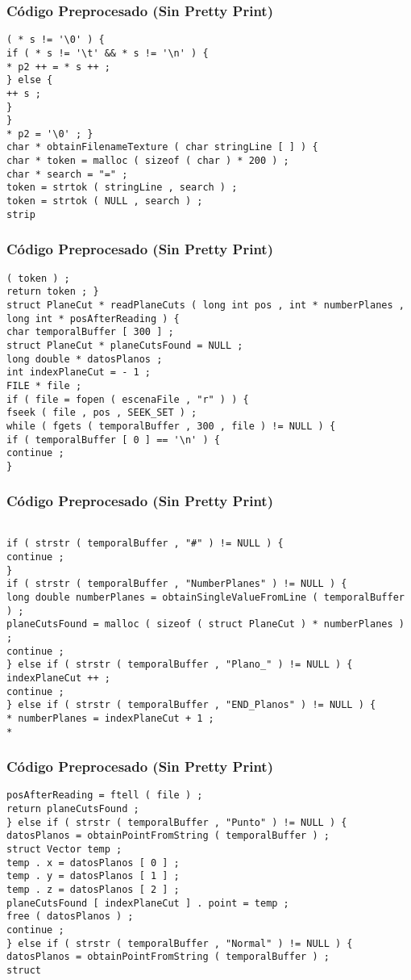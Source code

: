 \documentclass{beamer}
\begin{document}
\begin{frame}[fragile]
\frametitle{C\'odigo Preprocesado (Sin Pretty Print)}
\begin{lstlisting}[style=CStyle]
( * s != '\0' ) { 
if ( * s != '\t' && * s != '\n' ) { 
* p2 ++ = * s ++ ; 
} else { 
++ s ; 
} 
} 
* p2 = '\0' ; } 
char * obtainFilenameTexture ( char stringLine [ ] ) { 
char * token = malloc ( sizeof ( char ) * 200 ) ; 
char * search = "=" ; 
token = strtok ( stringLine , search ) ; 
token = strtok ( NULL , search ) ; 
strip \end{lstlisting}
\end{frame}
\begin{frame}[fragile]
\frametitle{C\'odigo Preprocesado (Sin Pretty Print)}
\begin{lstlisting}[style=CStyle]
( token ) ; 
return token ; } 
struct PlaneCut * readPlaneCuts ( long int pos , int * numberPlanes , long int * posAfterReading ) { 
char temporalBuffer [ 300 ] ; 
struct PlaneCut * planeCutsFound = NULL ; 
long double * datosPlanos ; 
int indexPlaneCut = - 1 ; 
FILE * file ; 
if ( file = fopen ( escenaFile , "r" ) ) { 
fseek ( file , pos , SEEK_SET ) ; 
while ( fgets ( temporalBuffer , 300 , file ) != NULL ) { 
if ( temporalBuffer [ 0 ] == '\n' ) { 
continue ; 
} \end{lstlisting}
\end{frame}
\begin{frame}[fragile]
\frametitle{C\'odigo Preprocesado (Sin Pretty Print)}
\begin{lstlisting}[style=CStyle]

if ( strstr ( temporalBuffer , "#" ) != NULL ) { 
continue ; 
} 
if ( strstr ( temporalBuffer , "NumberPlanes" ) != NULL ) { 
long double numberPlanes = obtainSingleValueFromLine ( temporalBuffer ) ; 
planeCutsFound = malloc ( sizeof ( struct PlaneCut ) * numberPlanes ) ; 
continue ; 
} else if ( strstr ( temporalBuffer , "Plano_" ) != NULL ) { 
indexPlaneCut ++ ; 
continue ; 
} else if ( strstr ( temporalBuffer , "END_Planos" ) != NULL ) { 
* numberPlanes = indexPlaneCut + 1 ; 
* \end{lstlisting}
\end{frame}
\begin{frame}[fragile]
\frametitle{C\'odigo Preprocesado (Sin Pretty Print)}
\begin{lstlisting}[style=CStyle]
posAfterReading = ftell ( file ) ; 
return planeCutsFound ; 
} else if ( strstr ( temporalBuffer , "Punto" ) != NULL ) { 
datosPlanos = obtainPointFromString ( temporalBuffer ) ; 
struct Vector temp ; 
temp . x = datosPlanos [ 0 ] ; 
temp . y = datosPlanos [ 1 ] ; 
temp . z = datosPlanos [ 2 ] ; 
planeCutsFound [ indexPlaneCut ] . point = temp ; 
free ( datosPlanos ) ; 
continue ; 
} else if ( strstr ( temporalBuffer , "Normal" ) != NULL ) { 
datosPlanos = obtainPointFromString ( temporalBuffer ) ; 
struct \end{lstlisting}
\end{frame}
\end{document}

